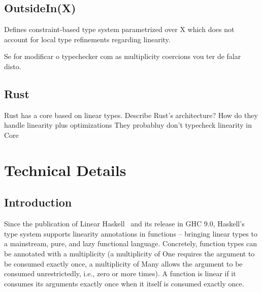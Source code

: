 \documentclass[]{lwnovathesis}
\begin{document}
\section{OutsideIn(X)\label{related-work-gadts}}

Defines constraint-based type system parametrized over X which does not account
for local type refinements regarding linearity.

Se for modificar o typechecker com as multiplicity coercions vou ter de falar
disto.

\section{Rust}

Rust has a core based on linear types. Describe Rust's architecture?
How do they handle linearity plus optimizations
They probabluy don't typecheck linearity in Core

\chapter{Technical Details}




\section{Introduction}


Since the publication of Linear Haskell~\cite{linearhaskell} and its release in GHC 9.0,
Haskell's type system supports linearity annotations in functions -- bringing
linear types to a mainstream, pure, and lazy functional language. Concretely,
function types can be annotated with a multiplicity (a multiplicity of One
requires the argument to be consumed exactly once, a multiplicity of Many allows
the argument to be consumed unrestrictedly, i.e., zero or more times). A
function is linear if it consumes its arguments exactly once when it itself is
consumed exactly once.
\end{document}

